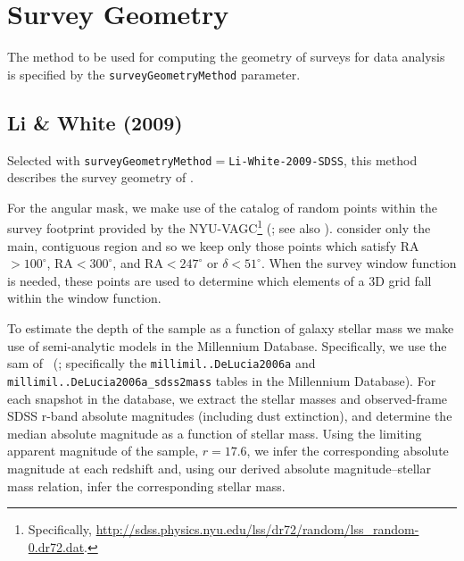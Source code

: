 \section{Survey Geometry}

The method to be used for computing the geometry of surveys for data analysis is specified by the {\tt surveyGeometryMethod} parameter.

\subsection{Li \& White (2009)}

Selected with {\tt surveyGeometryMethod}$=${\tt Li-White-2009-SDSS}, this method describes the survey geometry of \cite{li_distribution_2009}. 

For the angular mask, we make use of the catalog of random points within the survey footprint provided by the NYU-VAGC\footnote{Specifically, \href{http://sdss.physics.nyu.edu/lss/dr72/random/lss_random-0.dr72.dat}{http://sdss.physics.nyu.edu/lss/dr72/random/lss\_random-0.dr72.dat}.} (\citealt{blanton_new_2005}; see also \citealt{adelman-mccarthy_sixth_2008,padmanabhan_improved_2008}). \cite{li_distribution_2009} consider only the main, contiguous region and so we keep only those points which satisfy RA$>100^\circ$, RA$<300^\circ$, and RA$<247^\circ$ or $\delta< 51^\circ$. When the survey window function is needed, these points are used to determine which elements of a 3D grid fall within the window function.

To estimate the depth of the \cite{li_distribution_2009} sample as a function of galaxy stellar mass we make use of semi-analytic models in the Millennium Database. Specifically, we use the \gls{sam} of \citeauthor{de_lucia_hierarchical_2007}~(\citeyear{de_lucia_hierarchical_2007}; specifically the {\tt millimil..DeLucia2006a} and {\tt millimil..DeLucia2006a\_sdss2mass} tables in the Millennium Database). For each snapshot in the database, we extract the stellar masses and observed-frame SDSS r-band absolute magnitudes (including dust extinction), and determine the median absolute magnitude as a function of stellar mass. Using the limiting apparent magnitude of the \cite{li_distribution_2009} sample, $r=17.6$, we infer the corresponding absolute magnitude at each redshift and, using our derived absolute magnitude--stellar mass relation, infer the corresponding stellar mass.

